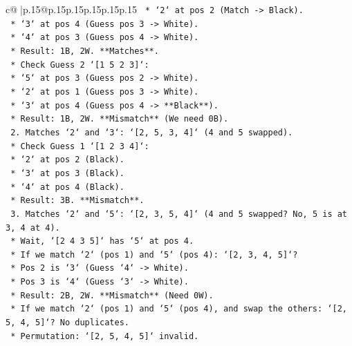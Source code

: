 \documentclass{article}
\begin{document}
{\begin{supertabular}{c@{$\;$}|p{.15\linewidth}@{}p{.15\linewidth}p{.15\linewidth}p{.15\linewidth}p{.15\linewidth}p{.15\linewidth}}
{{{\texttt{                    *   `2` at pos 2 (Match {-}> Black).} \\
\texttt{                    *   `3` at pos 4 (Guess pos 3 {-}> White).} \\
\texttt{                    *   `4` at pos 3 (Guess pos 4 {-}> White).} \\
\texttt{                    *   Result: 1B, 2W. **Matches**.} \\
\texttt{                *   Check Guess 2 `{[}1 5 2 3{]}`:} \\
\texttt{                    *   `5` at pos 3 (Guess pos 2 {-}> White).} \\
\texttt{                    *   `2` at pos 1 (Guess pos 3 {-}> White).} \\
\texttt{                    *   `3` at pos 4 (Guess pos 4 {-}> **Black**).} \\
\texttt{                    *   Result: 1B, 2W. **Mismatch** (We need 0B).} \\
\texttt{            2.  Matches `2` and `3`: `{[}2, 5, 3, 4{]}` (4 and 5 swapped).} \\
\texttt{                *   Check Guess 1 `{[}1 2 3 4{]}`:} \\
\texttt{                    *   `2` at pos 2 (Black).} \\
\texttt{                    *   `3` at pos 3 (Black).} \\
\texttt{                    *   `4` at pos 4 (Black).} \\
\texttt{                    *   Result: 3B. **Mismatch**.} \\
\texttt{            3.  Matches `2` and `5`: `{[}2, 3, 5, 4{]}` (4 and 5 swapped? No, 5 is at 3, 4 at 4).} \\
\texttt{                *   Wait, `{[}2 4 3 5{]}` has `5` at pos 4.} \\
\texttt{                *   If we match `2` (pos 1) and `5` (pos 4): `{[}2, 3, 4, 5{]}`?} \\
\texttt{                    *   Pos 2 is `3` (Guess `4` {-}> White).} \\
\texttt{                    *   Pos 3 is `4` (Guess `3` {-}> White).} \\
\texttt{                    *   Result: 2B, 2W. **Mismatch** (Need 0W).} \\
\texttt{                *   If we match `2` (pos 1) and `5` (pos 4), and swap the others: `{[}2, 5, 4, 5{]}`? No duplicates.} \\
\texttt{                *   Permutation: `{[}2, 5, 4, 5{]}` invalid.} \\
}}}
\end{supertabular}}
\end{document}
